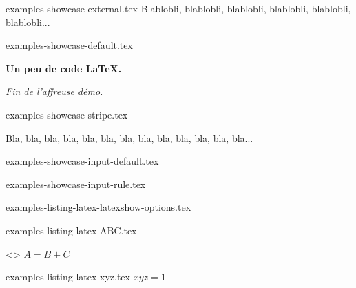 \begin{filecontents*}[overwrite]{examples-showcase-external.tex}
Blablobli, blablobli, blablobli, blablobli, blablobli, blablobli...
\end{filecontents*}


\begin{filecontents*}[overwrite]{examples-showcase-default.tex}
\begin{tdocshowcase}
    \bfseries Un peu de code \LaTeX.

    \bigskip

    \emph{\large Fin de l'affreuse démo.}
\end{tdocshowcase}
\end{filecontents*}


\begin{filecontents*}[overwrite]{examples-showcase-stripe.tex}
\begin{tdocshowcase}[style = stripe]
    Bla, bla, bla, bla, bla, bla, bla, bla, bla, bla, bla, bla, bla...
\end{tdocshowcase}
\end{filecontents*}


\begin{filecontents*}[overwrite]{examples-showcase-input-default.tex}
\end{filecontents*}


\begin{filecontents*}[overwrite]{examples-showcase-input-rule.tex}
\end{filecontents*}


\begin{filecontents*}[overwrite]{examples-listing-latex-latexshow-options.tex}
\end{filecontents*}


\begin{filecontents*}[overwrite]{examples-listing-latex-ABC.tex}
\begin{tdoclatex}<>
$A = B + C$
\end{tdoclatex}
\end{filecontents*}


\begin{filecontents*}[overwrite]{examples-listing-latex-xyz.tex}
$x y z = 1$
\end{filecontents*}


